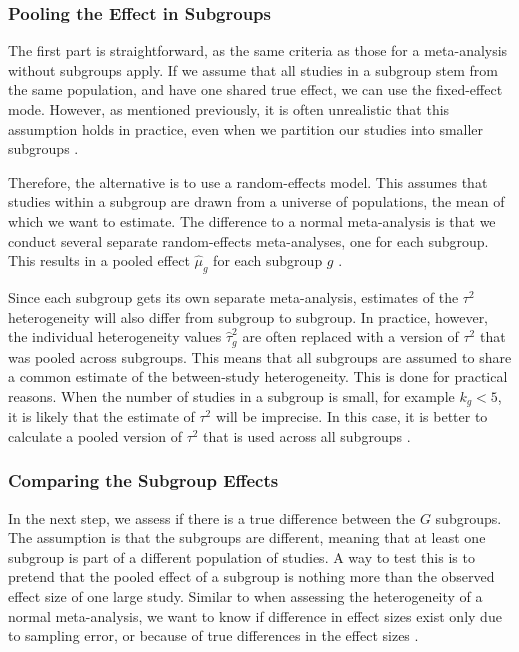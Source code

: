 \documentclass[../../../main.tex]{subfiles}
\begin{document}
\subsubsection{Pooling the Effect in Subgroups}

The first part is straightforward, as the same criteria as those for a meta-analysis without subgroups apply. If we assume that all studies in a subgroup stem from the same population, and have one shared true effect, we can use the fixed-effect mode. However, as mentioned previously, it is often unrealistic that this assumption holds in practice, even when we partition our studies into smaller subgroups \autocite{Harrer2021}.

Therefore, the alternative is to use a random-effects model. This assumes that studies within a subgroup are drawn from a universe of populations, the mean of which we want to estimate. The difference to a normal meta-analysis is that we conduct several separate random-effects meta-analyses, one for each subgroup. This results in a pooled effect $\hat{\mu}_g$ for each subgroup $g$ \autocite{Harrer2021}.

Since each subgroup gets its own separate meta-analysis, estimates of the $\tau^2$ heterogeneity will also differ from subgroup to subgroup. In practice, however, the individual heterogeneity values $\hat{\tau}_g^2$ are often replaced with a version of $\tau^2$ that was pooled across subgroups. This means that all subgroups are assumed to share a common estimate of the between-study heterogeneity. This is done for practical reasons. When the number of studies in a subgroup is small, for example $k_g<5$, it is likely that the estimate of $\tau^2$ will be imprecise. In this case, it is better to calculate a pooled version of $\tau^2$ that is used across all subgroups \autocite{Harrer2021}.

\subsubsection{Comparing the Subgroup Effects}

In the next step, we assess if there is a true difference between the $G$ subgroups. The assumption is that the subgroups are different, meaning that at least one subgroup is part of a different population of studies. A way to test this is to pretend that the pooled effect of a subgroup is nothing more than the observed effect size of one large study. Similar to when assessing the heterogeneity of a normal meta-analysis, we want to know if difference in effect sizes exist only due to sampling error, or because of true differences in the effect sizes \autocite{Harrer2021}.
\end{document}

